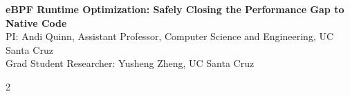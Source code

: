 \documentclass[11pt]{article}
\begin{document}
\setcounter{page}{1}

\begin{center}
{\large \textbf{eBPF Runtime Optimization: Safely Closing the Performance Gap to Native Code}}\\[0.4em]
PI: Andi Quinn, Assistant Professor, Computer Science and Engineering, UC Santa Cruz\\
Grad Student Researcher: Yusheng Zheng, UC Santa Cruz
\end{center}


% 
% 
% 
% 
% 

\vspace{-4mm}
\let\OLDthebibliography\thebibliography
\renewcommand\thebibliography[1]{
  \OLDthebibliography{#1}
  \setlength{\parskip}{0pt}
  \setlength{\itemsep}{0pt plus 0.2ex}
}
{\tiny
\setlength{\columnsep}{8pt}
\begin{multicols}{2}

\end{multicols}
}

%
\end{document}
